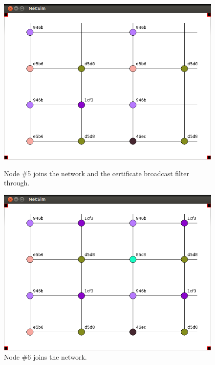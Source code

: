 \documentclass[ %
                    author={Luke Murray},
                supervisor={Dr. Simon Hollis},
                     title={Shadow Peer-to-Peer Networks},
                  subtitle={},
                    degree={MEng},
                      year={2013} ]{thesis}
\begin{document}
\begin{figure}[h]
    \centering
    \begin{minipage}[b]{0.45\linewidth}
        \centering
        \includegraphics[width=\linewidth]{sim_pics/expand_7.png}
        \caption{Node \#5 joins the network and the certificate broadcast filter through.}
        \label{sim_expand7}
    \end{minipage}
    \hspace{0.5cm}
    \begin{minipage}[b]{0.45\linewidth}
        \centering
        \includegraphics[width=\linewidth]{sim_pics/expand_8.png}
        \caption{Node \#6 joins the network.}
        \label{sim_expand8}
    \end{minipage}

\end{figure}
\end{document}
